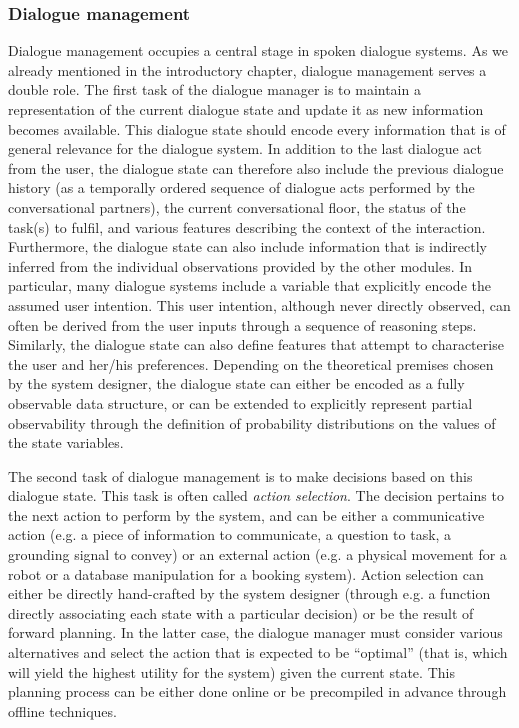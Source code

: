 \subsubsection*{Dialogue management}

Dialogue management occupies a central stage in spoken dialogue systems.  As we already mentioned in the introductory chapter, dialogue management serves a double role.  The first task of the dialogue manager is to maintain a representation of the current dialogue state and update it as new information becomes available.  This dialogue state should encode every information that is of general relevance for the dialogue system.  In addition to the last dialogue act from the user, the dialogue state can therefore also include the previous dialogue history (as a temporally ordered sequence of dialogue acts performed by the conversational partners), the current conversational floor, the status of the task(s) to fulfil, and various features describing the context of the interaction.  Furthermore, the dialogue state can also include information that is indirectly inferred from the individual observations provided by the other modules. In particular, many dialogue systems include a variable that explicitly encode the assumed user intention.  This user intention, although never directly observed, can often be derived from the user inputs through a sequence of reasoning steps.  Similarly, the dialogue state can also define features that attempt to characterise the user and her/his preferences. Depending on the theoretical premises chosen by the system designer, the dialogue state can either be encoded as a fully observable data structure, or can be extended to explicitly represent partial observability through the definition of probability distributions on the values of the state variables. 

The second task of dialogue management is to make decisions based on this dialogue state.  This task is often called \textit{action selection}. The decision pertains to the next action to perform by the system, and can be either a communicative action (e.g. a piece of information to communicate, a question to task, a grounding signal to convey) or an external action (e.g. a physical movement for a robot or a database manipulation for a booking system). Action selection can either be directly hand-crafted by the system designer (through e.g. a function directly associating each state with a particular decision) or be the result of forward planning.  In the latter case, the dialogue manager must consider various alternatives and select the action that is expected to be ``optimal'' (that is, which will yield the highest utility for the system) given the current state.  This planning process can be either done online or be precompiled in advance through offline techniques.

